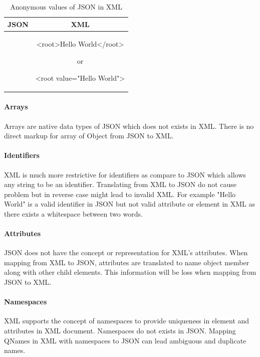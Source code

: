 \documentclass[a4paper,12pt]{article}
\begin{document}
\begin{longtable}{c|c}
	\caption{Anonymous values of JSON in XML}
	\label{tbl:Anonymous-xmljson}\\
	\textbf{JSON} & \textbf{XML}\\
	\hline
\begin{minipage}{.4\textwidth}
\begin{fakeJSON}
\end{fakeJSON}	
\end{minipage} &
\begin{minipage}{.55\textwidth}
\begin{fakeXML}[label=xml-anonymous]
	<root>Hello World</root>
\end{fakeXML}
or
\begin{fakeXML}
	<root value="Hello World">
\end{fakeXML}
\end{minipage}\\
\end{longtable}
	
		\paragraph{Arrays}
		Arrays are native data types of JSON which does not exists in XML. There is no direct markup for array of Object from JSON to XML.
		\paragraph{Identifiers}
		XML is much more restrictive for identifiers as compare to JSON which allows any string to be an identifier. Translating from XML to JSON do not cause problem but in reverse case might lead to invalid XML. For example "Hello World" is a valid identifier in JSON but not valid attribute or element in XML as there exists a whitespace between two words.
		\paragraph{Attributes}
		JSON does not have the concept or representation for XML's attributes. When mapping from XML to JSON, attributes are translated to name object member along with other child elements. This information will be loss when mapping from JSON to XML.
		\paragraph{Namespaces}
		XML supports the concept of namespaces to provide uniqueness in element and attributes in XML document. Namespaces do not exists in JSON. Mapping QNames in XML with namespaces to JSON can lead ambiguous and duplicate names.
\end{document}
